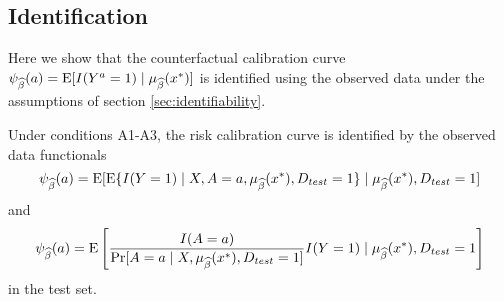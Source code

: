 \subsection{Identification}
Here we show that the counterfactual calibration curve $\psi_{\widehat{\beta}}(a) = \operatorname{E}[I(Y^a = 1) \mid \mu_{\widehat{\beta}}(x^*)]$ is identified using the observed data under the assumptions of section \ref{sec:identifiability}.
\begin{theorem}
     Under conditions A1-A3, the risk calibration curve is identified by the observed data functionals
\begin{equation}\label{eqn:cl_calib_estimand}
    \psi_{\widehat{\beta}}(a) = \operatorname{E}[\operatorname{E}\{I(Y = 1) \mid X, A = a, \mu_{\widehat{\beta}}(x^*), D_{test} = 1\}\mid \mu_{\widehat{\beta}}(x^*), D_{test} = 1]
\end{equation}
and 
\begin{equation}\label{eqn:ipw_calib_estimand}
    \psi_{\widehat{\beta}}(a) = \operatorname{E}\left[\frac{I(A = a)}{\Pr[A = a \mid X, \mu_{\widehat{\beta}}(x^*), D_{test} = 1]} I(Y=1) \mid \mu_{\widehat{\beta}}(x^*), D_{test} = 1\right]
\end{equation}
in the test set. 

\end{theorem}

